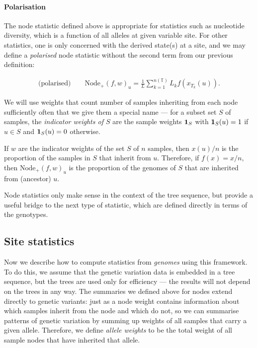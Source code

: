 \documentclass{article}
\newcommand{\nodep}{\mbox{Node}_+} %
\newcommand{\treeseq}{\mathbb{T}} %
\newcommand{\iw}{w} %
\newcommand{\nw}{x} %
\begin{document}
\paragraph{Polarisation}
The node statistic defined above is appropriate for statistics such as nucleotide diversity, which is a function
of all alleles at given variable site.  For other statistics, one is only concerned with the derived state(s)
at a site, and we may define a \emph{polarised} node statistic without the second term from our previous definition:

\begin{align}
    \text{(polarised)} \qquad
    \nodep(f, \iw)_u
    =
    \frac{1}{L} \sum_{k=1}^{n(\treeseq)} L_k f(\nw_{T_k}(u)) .
\end{align}

We will use weights that count number of samples inheriting from each node
sufficiently often that we give them a special name ---
for a subset set $S$ of samples,
the \emph{indicator weights of $S$} are the sample weights $\mathbf{1}_S$ with
$\mathbf{1}_S(u) = 1$ if $u \in S$ and $\mathbf{1}_S(u) = 0$ otherwise.

\begin{example} \label{ex:ancestry_props}
    If $\iw$ are the indicator weights of the set $S$ of $n$ samples,
    then $\nw(u) / n$ is the proportion of the samples in $S$ that inherit from $u$.
    Therefore, if $f(x) = x / n$,
    then $\nodep(f, \iw)_u$ is the proportion of the genomes of $S$
    that are inherited from (ancestor) $u$.
\end{example}

Node statistics only make sense in the context of the tree sequence,
but provide a useful bridge to the next type of statistic,
which are defined directly in terms of the genotypes.


\subsection*{Site statistics}

Now we describe how to compute statistics from \emph{genomes} using this framework.
To do this, we assume that the genetic variation data is embedded in a tree sequence,
but the trees are used only for efficiency --- the results will not depend on
the trees in any way. The summaries we defined above for nodes
extend directly to genetic variants: just as a node weight contains information about
which samples inherit from the node and which do not,
so we can summarise patterns of genetic variation by summing up weights of all samples
that carry a given allele.
Therefore, we define \emph{allele weights} to be
the total weight of all sample nodes that have inherited that allele.
\end{document}
